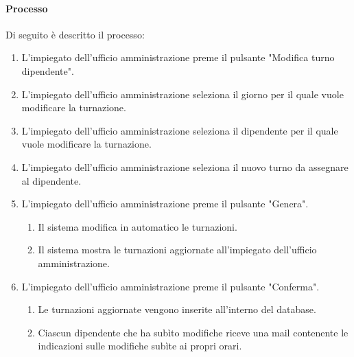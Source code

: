 \paragraph{Processo}
Di seguito è descritto il processo:
\begin{enumerate}
	\item L'impiegato dell'ufficio amministrazione preme il pulsante "Modifica turno dipendente".
	\item L'impiegato dell'ufficio amministrazione seleziona il giorno per il quale vuole modificare la turnazione.
	\item L'impiegato dell'ufficio amministrazione seleziona il dipendente per il quale vuole modificare la turnazione.
	\item L'impiegato dell'ufficio amministrazione seleziona il nuovo turno da assegnare al dipendente.
	\item L'impiegato dell'ufficio amministrazione preme il pulsante "Genera".
		\begin{enumerate}
			\item Il sistema modifica in automatico le turnazioni.
			\item Il sistema mostra le turnazioni aggiornate all'impiegato dell'ufficio amministrazione.
		\end{enumerate}
	\item L'impiegato dell'ufficio amministrazione preme il pulsante "Conferma".
		\begin{enumerate}
			\item Le turnazioni aggiornate vengono inserite all'interno del database.
			\item Ciascun dipendente che ha subìto modifiche riceve una mail contenente le indicazioni sulle modifiche subìte ai propri orari.
		\end{enumerate}
\end{enumerate}
